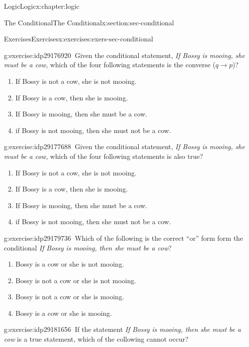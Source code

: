 \documentclass[twoside,10pt,]{book}
\numberwithin{equation}{section}
\newcommand{\converse}{{q {\rightarrow} p}}
\begin{document}
\begin{chapterptx}{Logic}{}{Logic}{}{}{x:chapter:logic}
\begin{sectionptx}{The Conditional}{}{The Conditional}{}{}{x:section:sec-conditional}
\begin{exercises-subsection}{Exercises}{}{Exercises}{}{}{x:exercises:exers-sec-conditional}
\begin{divisionexercise}{28}{}{}{g:exercise:idp29176920}%
\(\ \)Given the conditional statement, \emph{If Bossy is mooing, she must be a cow,} which of the four following statements is the converse (\(\converse\))? %
\begin{enumerate}[label=(\alph*)]
\item{}If Bossy is not a cow, she is not mooing.%
\item{}If Bossy is a cow, then she is mooing.%
\item{}If Bossy is mooing, then she must be a cow.%
\item{}if Bossy is not mooing, then she must not be a cow.%
\end{enumerate}
\end{divisionexercise}%
\begin{divisionexercise}{29}{}{}{g:exercise:idp29177688}%
\(\ \)Given the conditional statement, \emph{If Bossy is mooing, she must be a cow,} which of the four following statements is also true? %
\begin{enumerate}[label=(\alph*)]
\item{}If Bossy is not a cow, she is not mooing.%
\item{}If Bossy is a cow, then she is mooing.%
\item{}If Bossy is mooing, then she must be a cow.%
\item{}if Bossy is not mooing, then she must not be a cow.%
\end{enumerate}
\end{divisionexercise}%
\begin{divisionexercise}{30}{}{}{g:exercise:idp29179736}%
\(\ \)Which of the following is the correct ``or'' form form the conditional \emph{If Bossy is mooing, then she must be a cow}? %
\begin{enumerate}[label=(\alph*)]
\item{}Bossy is a cow or she is not mooing.%
\item{}Bossy is not a cow or she is not mooing.%
\item{}Bossy is not a cow or she is mooing.%
\item{}Bossy is a cow or she is mooing.%
\end{enumerate}
\end{divisionexercise}%
\begin{divisionexercise}{31}{}{}{g:exercise:idp29181656}%
\(\ \)If the statement \emph{If Bossy is mooing, then she must be a cow} is a true statement, which of the collowing cannot occur? %

\end{divisionexercise}
\end{exercises-subsection}
\end{sectionptx}
\end{chapterptx}
\end{document}

